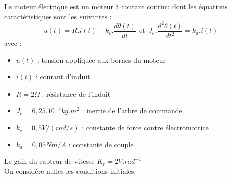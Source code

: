 Le moteur \'electrique est un moteur \`a courant continu dont les \'equations caract\'eristiques sont les suivantes :\\
\[u(t)=R.i(t)+k_e . \frac{d \theta(t)}{dt} \ \ \textrm{et} \ \ J_e . \frac{d^2 \theta(t)}{dt^2} = k_a . i(t)\]
avec :
\begin{itemize}
\item $u(t)$ : tension appliqu\'ee aux bornes du moteur
\item $i(t)$ : courant d'induit
\item $R = 2 \Omega$ : r\'esistance de l'induit
\item $J_e = 6,25.10^{-4} kg.m^2$ : inertie de l'arbre de commande
\item $k_e = 0,5 V / (rad / s)$ : constante de force contre \'electromotrice
\item $k_a = 0,05 Nm/A$ : constante de couple
\end{itemize}
Le gain du capteur de vitesse $K_r = 2V.rad^{-1}$\\
On consid\`ere nulles les conditions initiales.

